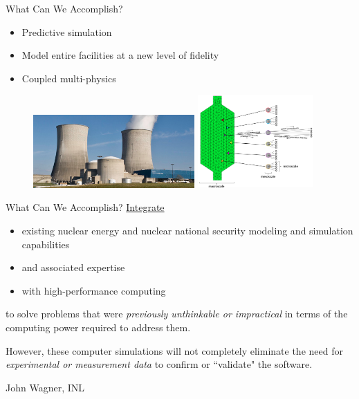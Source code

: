 \documentclass[xcolor=x11names,compress]{beamer}
\renewcommand{\(}{\begin{columns}}
\renewcommand{\)}{\end{columns}}
\newcommand{\<}[1]{\begin{column}{#1}}
\renewcommand{\>}{\end{column}}
\begin{document}
\begin{frame}{What Can We Accomplish?}
\begin{itemize}
\item Predictive simulation 
\item Model entire facilities at a new level of fidelity
\item Coupled multi-physics
\end{itemize}
\begin{figure}
\includegraphics[height=1.1in,clip]{../figs/WattsBar}
\hspace*{1em}
\includegraphics[height=1.4in,clip]{../figs/multiscale_pbr_d}
\end{figure}
\end{frame}

\begin{frame}{What Can We Accomplish?}
\underline{Integrate}
\begin{itemize}
\item existing nuclear energy and nuclear national security modeling and simulation capabilities
\item and associated expertise
\item with high-performance computing
\end{itemize}    
to solve problems that were \emph{previously unthinkable or impractical} in terms of the computing power required to address them.

\vspace*{1em}
However, these computer simulations will not completely eliminate the need for \emph{experimental or measurement data} to confirm or ``validate" the software. 

\vspace*{1em}
\hspace*{0.25 in} John Wagner, INL
\end{frame}
\end{document}
